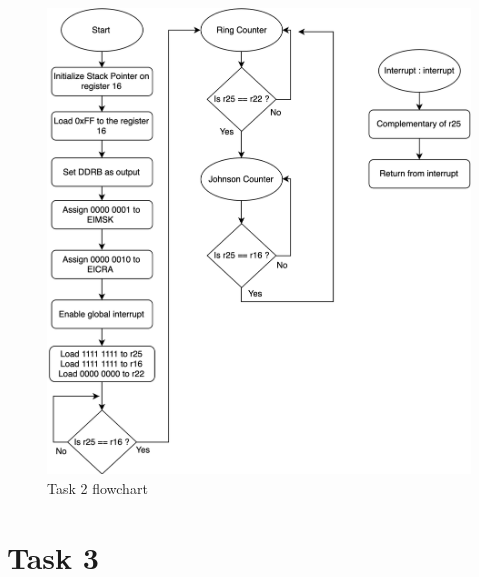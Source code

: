 \documentclass[a4paper,12pt]{article}
\begin{document}
\break
\begin{figure}
\begin{center}
\includegraphics[width=\textwidth/1]{flowchart/task2_flowchart.png}
\end{center}
\caption{Task 2 flowchart}
\label{task2}
\end{figure}

\break


\break
\section{Task 3}

\lstset{style=Asm}
\end{document}
